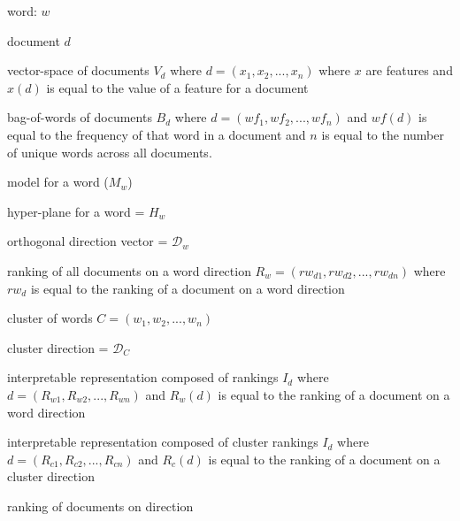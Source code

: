 

word: $w$

document $d$

vector-space of documents $V_d$ where $d = (x_1, x_2, ..., x_n)$ where $x$ are features and $x(d)$ is equal to the value of a feature for a document

bag-of-words of documents $B_d$ where $d = (wf_1, wf_2, ..., wf_n)$ and $wf(d)$ is equal to the frequency of that word in a document and $n$ is equal to the number of unique words across all documents.


model for a word ($M_w$)

hyper-plane for a word = $H_w$

orthogonal direction vector = $\mathcal{D}_w$

ranking of all documents on a word direction  $R_w = ({rw}_{d1}, {rw}_{d2}, ..., {rw}_{dn})$ where ${rw}_{d}$ is equal to the ranking of a document on a word direction

cluster of words $C = (w_1, w_2, ..., w_n)$

cluster direction = $\mathcal{D}_C$

interpretable representation composed of rankings $I_d$ where $d = (R_{w1}, R_{w2}, ..., R_{wn})$ and $R_w(d)$ is equal to the ranking of a document on a word direction

interpretable representation composed of cluster rankings $I_d$ where $d = (R_{c1}, R_{c2}, ..., R_{cn})$ and $R_c(d)$ is equal to the ranking of a document on a cluster direction

ranking of documents on direction
 

